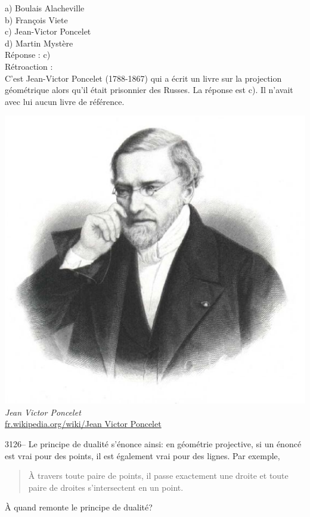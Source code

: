\documentclass[letterpaper, 12pt]{article}
\begin{document}
a) Boulais Alacheville\\
b) Fran\c cois Viete\\
c) Jean-Victor Poncelet\\
d) Martin Myst\`ere\\

R\'eponse : c)\\

R\'etroaction :\\
C'est Jean-Victor Poncelet (1788-1867) qui a \'ecrit un livre sur la projection g\'eom\'etrique alors qu'il \'etait  prisonnier des Russes. La r\'eponse est c). Il n'avait avec lui aucun livre de r\'ef\'erence.
\begin{center}
\includegraphics[scale=0.25]{Poncelet.eps}\\
\emph{{\small Jean Victor Poncelet}}\\
\href{http://fr.wikipedia.org/wiki/Jean_Victor_Poncelet}{fr.wikipedia.org/wiki/Jean Victor Poncelet}\\[5mm]
\end{center}



3126-- Le principe de dualit\'e s'\'enonce ainsi: en g\'eom\'etrie projective, si un \'enonc\'e est vrai pour des points, il est \'egalement vrai pour des lignes. Par exemple,\\
\begin{quote}
\og \`A travers toute paire de points, il passe exactement une droite et toute paire de droites s'intersectent en un point.\fg\\
\end{quote}
\`A quand remonte le principe de dualit\'e?\\
\end{document}

